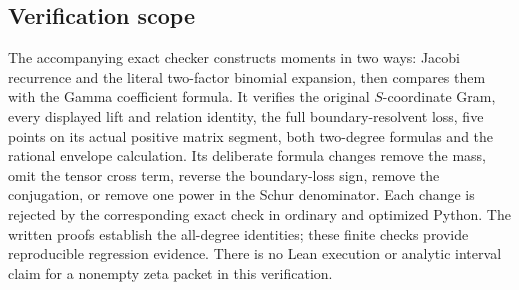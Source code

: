 \subsection{Verification scope}

The accompanying exact checker constructs moments in two ways:
Jacobi recurrence and the literal two-factor binomial expansion,
then compares them with the Gamma coefficient formula. It verifies
the original $S$-coordinate Gram, every displayed lift and relation
identity, the full boundary-resolvent loss, five points on its actual
positive matrix segment, both two-degree formulas and the rational
envelope calculation. Its deliberate formula changes remove the
mass, omit the tensor cross term, reverse the boundary-loss sign,
remove the conjugation, or remove one power in the Schur denominator.
Each change is rejected by the corresponding exact check in ordinary
and optimized Python. The written proofs establish the all-degree
identities; these finite checks provide reproducible regression evidence.
There is no Lean execution or analytic interval claim for a nonempty
zeta packet in this verification.


\endgroup
